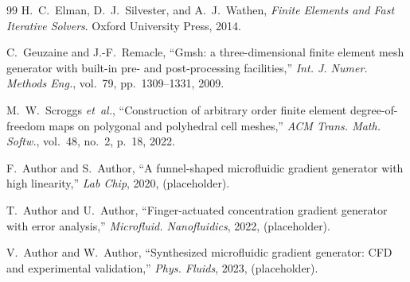 \begin{thebibliography}{99}
H.~C.~Elman, D.~J.~Silvester, and A.~J.~Wathen,
\emph{Finite Elements and Fast Iterative Solvers}. Oxford University Press, 2014.

C.~Geuzaine and J.-F.~Remacle,
``{G}msh: a three-dimensional finite element mesh generator with built-in pre- and post-processing facilities,''
\emph{Int. J. Numer. Methods Eng.}, vol.~79, pp.~1309--1331, 2009.

M.~W.~Scroggs \emph{et~al.},
``Construction of arbitrary order finite element degree-of-freedom maps on polygonal and polyhedral cell meshes,''
\emph{ACM Trans. Math. Softw.}, vol.~48, no.~2, p.~18, 2022.

F.~Author and S.~Author,
``A funnel-shaped microfluidic gradient generator with high linearity,''
\emph{Lab Chip}, 2020, (placeholder).

T.~Author and U.~Author,
``Finger-actuated concentration gradient generator with error analysis,''
\emph{Microfluid. Nanofluidics}, 2022, (placeholder).

V.~Author and W.~Author,
``Synthesized microfluidic gradient generator: CFD and experimental validation,''
\emph{Phys. Fluids}, 2023, (placeholder).

\end{thebibliography}
